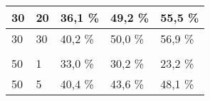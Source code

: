 \begin{table}[!htb]
\begin{tabular}{lllll}
\multicolumn{1}{|l|}{30}                                                     & \multicolumn{1}{l|}{20}                                                                & \multicolumn{1}{l|}{36,1 \%}                                                                                           & \multicolumn{1}{l|}{49,2 \%}                                                                                            & \multicolumn{1}{l|}{55,5 \%}                                                                                            \\ \hline
\multicolumn{1}{|l|}{30}                                                     & \multicolumn{1}{l|}{30}                                                                & \multicolumn{1}{l|}{40,2 \%}                                                                                           & \multicolumn{1}{l|}{50,0 \%}                                                                                            & \multicolumn{1}{l|}{56,9 \%}                                                                                            \\ \hline
                                                                             &                                                                                        &                                                                                                                       &                                                                                                                        &                                                                                                                        \\ \hline
\multicolumn{1}{|l|}{50}                                                     & \multicolumn{1}{l|}{1}                                                                 & \multicolumn{1}{l|}{33,0 \%}                                                                                           & \multicolumn{1}{l|}{30,2 \%}                                                                                            & \multicolumn{1}{l|}{23,2 \%}                                                                                            \\ \hline
\multicolumn{1}{|l|}{50}                                                     & \multicolumn{1}{l|}{5}                                                                 & \multicolumn{1}{l|}{40,4 \%}                                                                                           & \multicolumn{1}{l|}{43,6 \%}                                                                                            & \multicolumn{1}{l|}{48,1 \%}                                                                                            \\ \hline

\end{tabular}
\end{table}
